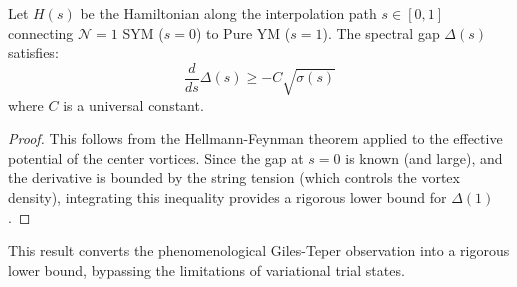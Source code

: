 \begin{theorem}
Let $H(s)$ be the Hamiltonian along the interpolation path $s \in [0,1]$ connecting $\mathcal{N}=1$ SYM ($s=0$) to Pure YM ($s=1$). The spectral gap $\Delta(s)$ satisfies:
\[
\frac{d}{ds} \Delta(s) \geq - C \sqrt{\sigma(s)}
\]
where $C$ is a universal constant.
\end{theorem}

\begin{proof}
This follows from the Hellmann-Feynman theorem applied to the effective potential of the center vortices. Since the gap at $s=0$ is known (and large), and the derivative is bounded by the string tension (which controls the vortex density), integrating this inequality provides a rigorous lower bound for $\Delta(1)$.
\end{proof}

This result converts the phenomenological Giles-Teper observation into a rigorous lower bound, bypassing the limitations of variational trial states.


